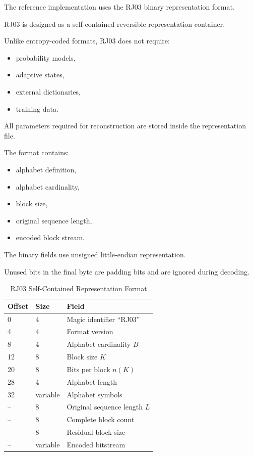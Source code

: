 \documentclass[onecolumn]{IEEEtran}
\begin{document}
The reference implementation uses the RJ03 binary representation format.

RJ03 is designed as a self-contained reversible representation
container.

Unlike entropy-coded formats, RJ03 does not require:

\begin{itemize}

\item probability models,

\item adaptive states,

\item external dictionaries,

\item training data.

\end{itemize}

All parameters required for reconstruction are stored inside the
representation file.

The format contains:

\begin{itemize}

\item alphabet definition,

\item alphabet cardinality,

\item block size,

\item original sequence length,

\item encoded block stream.

\end{itemize}

The binary fields use unsigned little-endian representation.

Unused bits in the final byte are padding bits and are ignored during
decoding.

\begin{table}[!t]
\caption{RJ03 Self-Contained Representation Format}
\label{tab:rj03}
\centering
\begin{tabular}{lll}
\toprule
Offset & Size & Field\\
\midrule
0 & 4 & Magic identifier ``RJ03''\\
4 & 4 & Format version\\
8 & 4 & Alphabet cardinality $B$\\
12 & 8 & Block size $K$\\
20 & 8 & Bits per block $n(K)$\\
28 & 4 & Alphabet length\\
32 & variable & Alphabet symbols\\
-- & 8 & Original sequence length $L$\\
-- & 8 & Complete block count\\
-- & 8 & Residual block size\\
-- & variable & Encoded bitstream\\
\bottomrule
\end{tabular}
\end{table}
\end{document}
